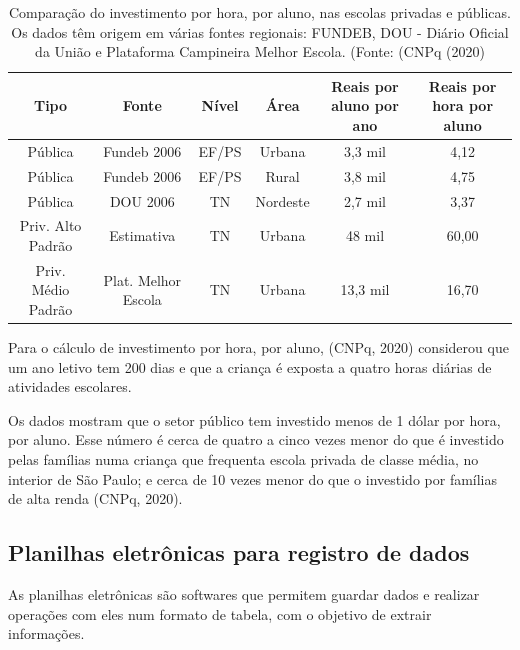 \begin{table}[htb]
\tiny
\caption{\label{23cb136314ecc87baf0c1a69a07f7ee70c1251f6}Comparação do investimento por hora, por aluno, nas escolas privadas e públicas. Os dados têm origem em várias fontes regionais: FUNDEB, DOU - Diário Oficial da União e Plataforma Campineira Melhor Escola. (Fonte: (CNPq (2020)}

\centering
\begin{tabular}{|c|c|c|c|c|c|}
\hline
Tipo  &  Fonte  &  Nível  &  Área  &  Reais por aluno por ano  &  Reais por hora por aluno \\
\hline
Pública  &  Fundeb 2006  &  EF/PS  &  Urbana  &  3,3 mil  &  4,12 \\
Pública  &  Fundeb 2006  &  EF/PS  &  Rural  &  3,8 mil  &  4,75 \\
Pública  &  DOU 2006  &  TN  &  Nordeste  &  2,7 mil  &  3,37 \\
Priv. Alto Padrão  &  Estimativa  &  TN  &  Urbana  &  48 mil  &  60,00 \\
Priv. Médio Padrão  &  Plat. Melhor Escola  &  TN  &  Urbana  &  13,3 mil  &  16,70 \\
\hline
\end{tabular}
\end{table}


Para o cálculo de investimento por hora, por aluno, (CNPq, 2020) considerou que um ano letivo tem 200 dias e que a criança é exposta a quatro horas diárias de atividades escolares.

Os dados mostram que o setor público tem investido menos de 1 dólar por hora, por aluno. Esse número é cerca de quatro a cinco vezes menor do que é investido pelas famílias numa criança que frequenta escola privada de classe média, no interior de São Paulo; e cerca de 10 vezes menor do que o investido por famílias de alta renda (CNPq, 2020).


\noindent\begin{center}\mbox{\centering{}}\end{center}


\subsection[Planilhas eletrônicas para registro de dados]{Planilhas eletrônicas para registro de dados}\label{Planilhas eletrônicas para registro de dados}
As planilhas eletrônicas são softwares que permitem guardar dados e realizar operações com eles num formato de tabela, com o objetivo de  extrair informações.

